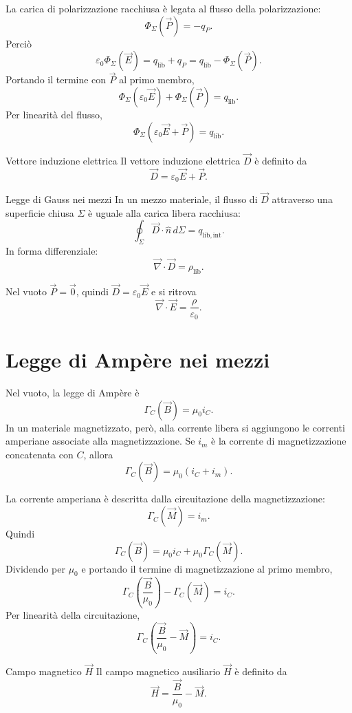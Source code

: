 \documentclass[a4paper]{article}
\begin{document}
La carica di polarizzazione racchiusa è legata al flusso della polarizzazione:
\[
\Phi_\Sigma(\vec{P})=-q_P.
\]
Perciò
\[
\varepsilon_0\Phi_\Sigma(\vec{E})=q_{\mathrm{lib}}+q_P
=q_{\mathrm{lib}}-\Phi_\Sigma(\vec{P}).
\]
Portando il termine con \(\vec{P}\) al primo membro,
\[
\Phi_\Sigma(\varepsilon_0\vec{E})+\Phi_\Sigma(\vec{P})=q_{\mathrm{lib}}.
\]
Per linearità del flusso,
\[
\Phi_\Sigma\left(\varepsilon_0\vec{E}+\vec{P}\right)=q_{\mathrm{lib}}.
\]

\begin{snippetdefinition}{Vettore induzione elettrica}
Il vettore induzione elettrica \(\vec{D}\) è definito da
\[
    \vec{D}=\varepsilon_0\vec{E}+\vec{P}.
\]
\end{snippetdefinition}

\begin{snippettheorem}{Legge di Gauss nei mezzi}
In un mezzo materiale, il flusso di \(\vec{D}\) attraverso una superficie chiusa \(\Sigma\) è uguale alla carica libera racchiusa:
\[
    \oint_\Sigma \vec{D}\cdot\hat{n}\,d\Sigma=q_{\mathrm{lib,int}}.
\]
In forma differenziale:
\[
    \vec{\nabla}\cdot\vec{D}=\rho_{\mathrm{lib}}.
\]
\end{snippettheorem}

Nel vuoto \(\vec{P}=\vec{0}\), quindi \(\vec{D}=\varepsilon_0\vec{E}\) e si ritrova
\[
\vec{\nabla}\cdot\vec{E}=\frac{\rho}{\varepsilon_0}.
\]

\section{Legge di Ampère nei mezzi}

Nel vuoto, la legge di Ampère è
\[
\Gamma_C(\vec{B})=\mu_0 i_C.
\]
In un materiale magnetizzato, però, alla corrente libera si aggiungono le correnti amperiane associate alla magnetizzazione. Se \(i_m\) è la corrente di magnetizzazione concatenata con \(C\), allora
\[
\Gamma_C(\vec{B})=\mu_0\left(i_C+i_m\right).
\]

La corrente amperiana è descritta dalla circuitazione della magnetizzazione:
\[
\Gamma_C(\vec{M})=i_m.
\]
Quindi
\[
\Gamma_C(\vec{B})=\mu_0 i_C+\mu_0\Gamma_C(\vec{M}).
\]
Dividendo per \(\mu_0\) e portando il termine di magnetizzazione al primo membro,
\[
\Gamma_C\left(\frac{\vec{B}}{\mu_0}\right)-\Gamma_C(\vec{M})=i_C.
\]
Per linearità della circuitazione,
\[
\Gamma_C\left(\frac{\vec{B}}{\mu_0}-\vec{M}\right)=i_C.
\]

\begin{snippetdefinition}{Campo magnetico \(\vec{H}\)}
Il campo magnetico ausiliario \(\vec{H}\) è definito da
\[
    \vec{H}=\frac{\vec{B}}{\mu_0}-\vec{M}.
\]
\end{snippetdefinition}
\end{document}

